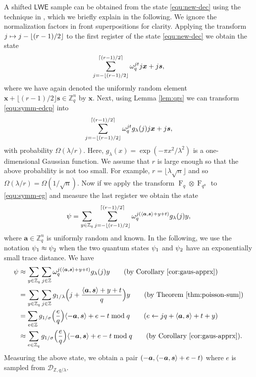 \documentclass[11pt]{article}
\theoremstyle{plain}
\theoremstyle{definition}
\DeclareMathOperator{\qft}{F}
\let\ket\relax
\DeclarePairedDelimiter{\ket}{\lvert}{\rangle}
\DeclarePairedDelimiter{\lrang}{\langle}{\rangle}
\def\Z{\mathbb{Z}}
\def\lwe{\mathsf{LWE}}
\begin{document}
A shifted $\lwe$ sample can be obtained from the state \eqref{equ:new-dec} using the technique in \cite{brakerski2018learning}, which we briefly explain in the following. We ignore the normalization factors in front superpositions for clarity. Applying the transform $\ket{j} \mapsto \ket{j - \lfloor (r - 1) / 2 \rfloor}$ to the first register of the state \eqref{equ:new-dec} we obtain the state
\begin{equation}
    \label{equ:symm-edcp}
    \sum_{j = -\lfloor (r - 1) / 2 \rfloor}^{\lceil (r - 1) / 2 \rceil} \omega_q^{jt} \ket{j}\ket{\bm{x} + j\bm{s}},
\end{equation}
where we have again denoted the uniformly random element $\bm{x} + \lfloor (r - 1) / 2 \rfloor \bm{s} \in \Z_q^n$ by $\bm{x}$. Next, using Lemma \ref{lem:qrs} we can transform \eqref{equ:symm-edcp} into 
\begin{equation}
    \label{equ:symm-eg}
    \sum_{j = -\lfloor (r - 1) / 2 \rfloor}^{\lceil (r - 1) / 2 \rceil} \omega_q^{jt} g_\lambda(j) \ket{j}\ket{\bm{x} + j\bm{s}},
\end{equation}
with probability $\Omega(\lambda / r)$. Here, $g_\lambda(x) = \exp(-\pi x^2 / \lambda^2)$ is a one-dimensional Gaussian function. We assume that $r$ is large enough so that the above probability is not too small. For example, $r = \lfloor \lambda\sqrt{n} \rfloor$ and so $\Omega(\lambda / r) = \Omega(1 / \sqrt{n})$. Now if we apply the transform $\qft_q \otimes \qft_{q^n}$ to \eqref{equ:symm-eg} and measure the last register we obtain the state
\[ \ket{\psi} = \sum_{y \in \Z_q} \sum_{j = -\lfloor (r - 1) / 2 \rfloor}^{\lceil (r - 1) / 2 \rceil} \omega_q^{j(\lrang{\bm{a}, \bm{s}} + y + t)} g_\lambda(j) \ket{y}, \]
where $\bm{a} \in \Z_q^n$ is uniformly random and known. In the following, we use the notation $\ket{\psi_1} \approx \ket{\psi_2}$ when the two quantum states $\ket{\psi_1}$ and $\ket{\psi_2}$ have an exponentially small trace distance. We have
\begin{align*}
    \ket{\psi}
    & \approx \sum_{y \in \Z_q} \sum_{j \in \Z} \omega_q^{j(\lrang{\bm{a}, \bm{s}} + y + t)} g_\lambda(j) \ket{y} \tag{by Corollary \ref{cor:gaus-apprx}} \\
    & = \sum_{y \in \Z_q} \sum_{j \in \Z} g_{1/\lambda} \Big( j + \frac{\lrang{\bm{a}, \bm{s}} + y + t}{q} \Big) \ket{y} \tag{by Theorem \ref{thm:poisson-sum}} \\
    & = \sum_{e \in \Z} g_{1/\sigma} \Big( \frac{e}{q} \Big) \ket{\lrang{-\bm{a}, \bm{s}} + e - t \bmod q} \tag{$e \leftarrow jq + \lrang{\bm{a}, \bm{s}} + t + y$} \\
    & \approx \sum_{e \in \Z_q} g_{1/\sigma} \Big( \frac{e}{q} \Big) \ket{\lrang{-\bm{a}, \bm{s}} + e - t \bmod q} \tag{by Corollary \ref{cor:gaus-apprx}}.
\end{align*}
Measuring the above state, we obtain a pair $(-\bm{a}, \lrang{-\bm{a}, \bm{s}} + e - t)$ where $e$ is sampled from $\mathcal{D}_{\Z, q / \lambda}$.
\end{document}
